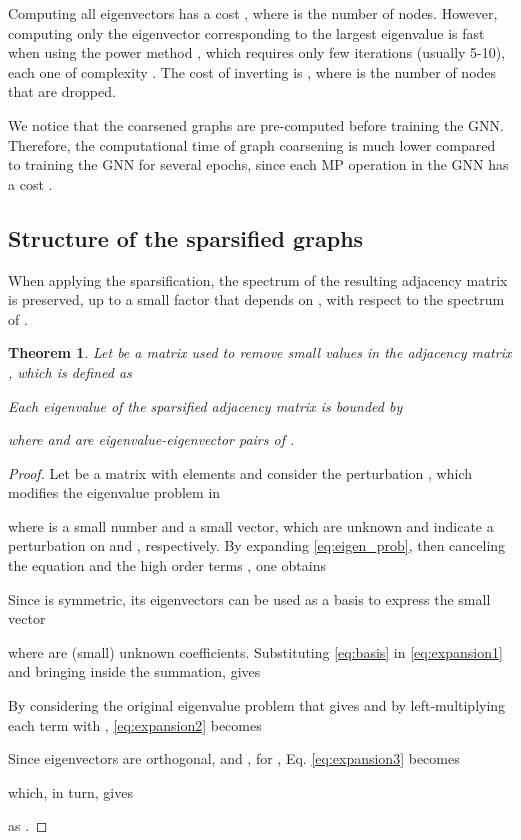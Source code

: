 \documentclass[journal]{IEEEtran}
\newtheorem{theorem}{Theorem}
\begin{document}
Computing all eigenvectors has a cost , where  is the number of nodes. However, computing only the eigenvector corresponding to the largest eigenvalue is fast when using the power method \cite{watkins2004fundamentals}, which requires only few iterations (usually 5-10), each one of complexity .
The cost of inverting  is , where  is the number of nodes that are dropped. 


We notice that the coarsened graphs are pre-computed before training the GNN.
Therefore, the computational time of graph coarsening is much lower compared to training the GNN for several epochs, since each MP operation in the GNN has a cost .


\subsection{Structure of the sparsified graphs}
When applying the sparsification, the spectrum of the resulting adjacency matrix  is preserved, up to a small factor that depends on , with respect to the spectrum of .

\begin{theorem}
Let  be a matrix used to remove small values in the adjacency matrix , which is defined as

Each eigenvalue  of the sparsified adjacency matrix  is bounded by 

where  and  are eigenvalue-eigenvector pairs of .
\end{theorem}

\begin{proof}
Let  be a matrix with elements  and consider the perturbation , which modifies the eigenvalue problem  in 

where  is a small number and  a small vector, which are unknown and indicate a  perturbation on  and , respectively.
By expanding \eqref{eq:eigen_prob}, then canceling the equation  and the high order terms , one obtains



Since  is symmetric, its eigenvectors can be used as a basis to express the small vector 

where  are (small) unknown coefficients. 
Substituting \eqref{eq:basis} in \eqref{eq:expansion1} and bringing  inside the summation, gives


By considering the original eigenvalue problem that gives  and by left-multiplying each term with , \eqref{eq:expansion2} becomes

Since eigenvectors are orthogonal,  and , for , Eq. \eqref{eq:expansion3} becomes

which, in turn, gives 

as .
\end{proof}
\end{document}
